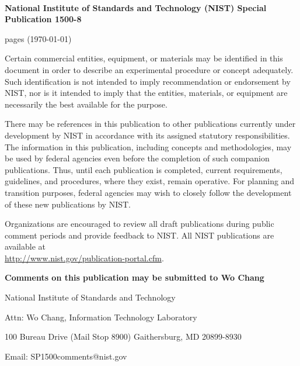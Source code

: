 

\
\begin{center}
{\bf National Institute of Standards and Technology (NIST) Special
  Publication 1500-8}

\pageref{LastPage} pages (\today)
\end{center}

\begin{mdframed}[backgroundcolor=black!5,topline=false,bottomline=false,rightline=false,leftline=false]

  Certain commercial entities, equipment, or materials may be
  identified in this document in order to describe an experimental
  procedure or concept adequately. Such identification is not intended
  to imply recommendation or endorsement by NIST, nor is it intended
  to imply that the entities, materials, or equipment are necessarily
  the best available for the purpose.

  There may be references in this publication to other publications
  currently under development by NIST in accordance with its assigned
  statutory responsibilities. The information in this publication,
  including concepts and methodologies, may be used by federal
  agencies even before the completion of such companion
  publications. Thus, until each publication is completed, current
  requirements, guidelines, and procedures, where they exist, remain
  operative. For planning and transition purposes, federal agencies
  may wish to closely follow the development of these new publications
  by NIST.

  Organizations are encouraged to review all draft publications during
  public comment periods and provide feedback
  to NIST. All NIST publications are available at \\
  \url{http://www.nist.gov/publication-portal.cfm}.

\end{mdframed}

\bigskip \bigskip \bigskip

\begin{center}
{\bf Comments on this publication may be submitted to Wo Chang}
\bigskip

National Institute of Standards and Technology

Attn: Wo Chang, Information Technology Laboratory

100 Bureau Drive (Mail Stop 8900) Gaithersburg, MD 20899-8930

Email: SP1500comments@nist.gov 
\end{center}

\newpage
